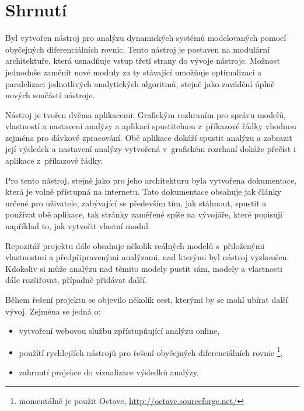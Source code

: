 \documentclass{parasim}
\begin{document}
\section{Shrnutí}

Byl vytvořen nástroj pro analýzu dynamických systémů modelovaných pomocí
obyčejných diferenciálních rovnic. Tento nástroj je postaven na modulární architektuře,
která usnadňuje vstup třetí strany do vývoje nástroje. Možnost jednoduše zaměnit nové moduly
za ty stávající umožňuje optimalizaci a paralelizaci jednotlivých analytických algoritmů,
stejně jako zavádění úplně nových součástí nástroje.

Nástroj je tvořen dvěma aplikacemi: Grafickým rozhraním pro správu modelů, vlastností a nastavení analýzy
a aplikací spustitelnou z~příkazové řádky vhodnou zejména pro dávkové zpracování. Obě aplikace dokáží spustit
analýzu a zobrazit její výsledek a nastavení analýzy vytvořená v~grafickém rozrhaní dokáže přečíst i aplikace
z~příkazové řádky.

Pro tento nástroj, stejně jako pro jeho architekturu byla vytvořena dokumentace, která je volně přístupná na internetu.
Tato dokumentace obsahuje jak články určené pro uživatele, zabývající se především tím, jak stáhnout, spustit a používat
obě aplikace, tak stránky zaměřené spíše na vývojáře, které popisují například to, jak vytvořit vlastní modul.

Repozitář projektu dále obsahuje několik reálných modelů s~přiloženými vlastnostmi a předpřipravenými analýzami,
nad kterými byl nástroj vyzkoušen. Kdokoliv si může analýzu nad těmito modely pustit sám, modely
a vlastnosti dále rozšiřovat, případně přidávat další.

Během řešení projektu se objevilo několik cest, kterými by se mohl ubírat další vývoj. Zejména se jedná o:

\begin{itemize}
	\item	vytvoření webovou službu zpřístupňující analýzu online,
	\item	použítí rychlejších nástrojů pro řešení obyčejných diferenciálních rovnic \footnote{momentálně je použit Octave, \url{http://octave.sourceforge.net/}},
	\item	zahrnutí projekce do vizualizace výsledků analýzy.
\end{itemize}
\end{document}
